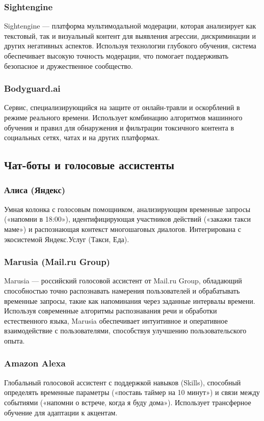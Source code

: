 \subsubsection{Sightengine}
Sightengine — платформа мультимодальной модерации, которая анализирует как текстовый, так и визуальный контент для выявления агрессии, дискриминации и других негативных аспектов. Используя технологии глубокого обучения, система обеспечивает высокую точность модерации, что помогает поддерживать безопасное и дружественное сообщество.

\subsubsection{Bodyguard.ai}
Сервис, специализирующийся на защите от онлайн-травли и оскорблений в режиме реального времени. Использует комбинацию алгоритмов машинного обучения и правил для обнаружения и фильтрации токсичного контента в социальных сетях, чатах и на других платформах.


\subsection{Чат-боты и голосовые ассистенты}

\subsubsection{Алиса (Яндекс)}
Умная колонка с голосовым помощником, анализирующим временные запросы («напомни в 18:00»), идентифицирующая участников действий («закажи такси маме») и распознающая контекст многошаговых диалогов. Интегрирована с экосистемой Яндекс.Услуг (Такси, Еда).

\subsubsection{Marusia (Mail.ru Group)}
Marusia — российский голосовой ассистент от Mail.ru Group, обладающий способностью точно распознавать намерения пользователей и обрабатывать временные запросы, такие как напоминания через заданные интервалы времени. Используя современные алгоритмы распознавания речи и обработки естественного языка, Marusia обеспечивает интуитивное и оперативное взаимодействие с пользователями, способствуя улучшению пользовательского опыта.

\subsubsection{Amazon Alexa}
Глобальный голосовой ассистент с поддержкой навыков (Skills), способный определять временные параметры («поставь таймер на 10 минут») и связи между событиями («напомни о встрече, когда я буду дома»). Использует трансферное обучение для адаптации к акцентам.

